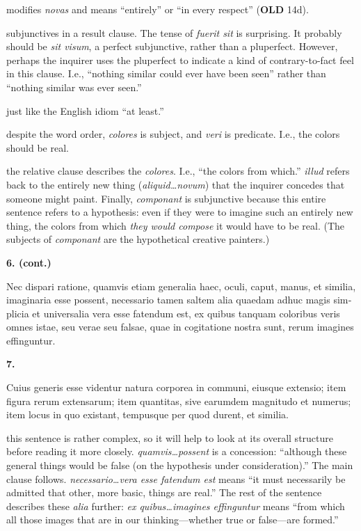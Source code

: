  modifies \textit{novas} and means ``entirely'' or ``in every respect'' (\textbf{OLD} 14d).

 subjunctives in a result clause. The tense of \textit{fuerit sit} is surprising. It probably should be \textit{sit visum}, a perfect subjunctive, rather than a pluperfect. However, perhaps the inquirer uses the pluperfect to indicate a kind of contrary-to-fact feel in this clause. I.e., ``nothing similar could ever have been seen'' rather than ``nothing similar was ever seen.''

 just like the English idiom ``at least.''

 despite the word order, \textit{colores} is subject, and \textit{veri} is predicate. I.e., the colors should be real.

 the relative clause describes the \textit{colores}. I.e., ``the colors from which.'' \textit{illud} refers back to the entirely new thing (\textit{aliquid\dots novum}) that the inquirer concedes that someone might paint. Finally, \textit{componant} is subjunctive because this entire sentence refers to a hypothesis: even if they were to imagine such an entirely new thing, the colors from which \textit{they would compose} it would have to be real. (The subjects of \textit{componant} are the hypothetical creative painters.)

\clearpage

\beginnumbering
\pstart
{}
\textbf{6. (cont.)} \begin{latin}Nec dispari ratione, quamvis etiam generalia haec, oculi, caput, manus, et similia, imaginaria esse possent, necessario tamen saltem alia quaedam adhuc magis simplicia et universalia vera esse fatendum est, ex quibus tanquam coloribus veris omnes istae, seu verae seu falsae, quae in cogitatione nostra sunt, rerum imagines effinguntur.\end{latin}
\pend
\endnumbering
\beginnumbering
\pstart
\textbf{7.} \begin{latin}Cuius generis esse videntur natura corporea in communi, eiusque extensio; item figura rerum extensarum; item quantitas, sive earumdem magnitudo et numerus; item locus in quo existant, tempusque per quod durent, et similia.\end{latin}
\pend
\endnumbering

\prenotes

 this sentence is rather complex, so it will help to look at its overall structure before reading it more closely. \textit{quamvis\dots possent} is a concession: ``although these general things would be false (on the hypothesis under consideration).'' The main clause follows. \textit{necessario\dots vera esse fatendum est} means ``it must necessarily be admitted that other, more basic, things are real.'' The rest of the sentence describes these \textit{alia} further: \textit{ex quibus\dots imagines effinguntur} means ``from which all those images that are in our thinking---whether true or false---are formed.''

